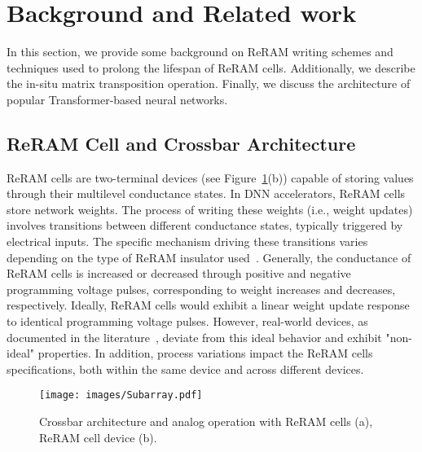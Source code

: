 
\section{Background and Related work}\label{s:Background}
In this section, we provide some background on ReRAM writing schemes and techniques used to prolong the lifespan of ReRAM cells. Additionally, we describe the in-situ matrix transposition operation. Finally, we discuss the architecture of popular Transformer-based neural networks.

\subsection{ReRAM Cell and Crossbar Architecture}\label{subs:Writing}
ReRAM cells are two-terminal devices (see Figure~\ref{fig:CrossBars}(b)) capable of storing values through their multilevel conductance states. In DNN accelerators, ReRAM cells store network weights. The process of writing these weights (i.e., weight updates) involves transitions between different conductance states, typically triggered by electrical inputs. The specific mechanism driving these transitions varies depending on the type of ReRAM insulator used~\cite{insulator, insulator2, Park_2013, Woo_2016}. Generally, the conductance of ReRAM cells is increased or decreased through positive and negative programming voltage pulses, corresponding to weight increases and decreases, respectively. Ideally, ReRAM cells would exhibit a linear weight update response to identical programming voltage pulses. However, real-world devices, as documented in the literature~\cite{trade-offs_MLC,Gao_2015}, deviate from this ideal behavior and exhibit "non-ideal" properties. In addition, process variations impact the ReRAM cells specifications, both within the same device and across different devices.

\begin{figure}[t!]
    \centering
    \texttt{[image: images/Subarray.pdf]}
    \caption{Crossbar architecture and analog operation with ReRAM cells (a), ReRAM cell device (b).}
    \label{fig:CrossBars}
\end{figure}

